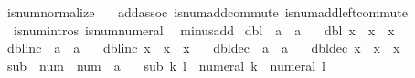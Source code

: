 \begin{isabellebody}
\endisatagproof
{\isafoldproof}%
%
\isadelimproof
\isanewline
%
\endisadelimproof
\isanewline
{}\isamarkupfalse%
\ is{\isacharunderscore}{\kern0pt}num{\isacharunderscore}{\kern0pt}normalize\ {\isacharequal}{\kern0pt}\isanewline
\ \ add{\isachardot}{\kern0pt}assoc\ is{\isacharunderscore}{\kern0pt}num{\isacharunderscore}{\kern0pt}add{\isacharunderscore}{\kern0pt}commute\ is{\isacharunderscore}{\kern0pt}num{\isacharunderscore}{\kern0pt}add{\isacharunderscore}{\kern0pt}left{\isacharunderscore}{\kern0pt}commute\isanewline
\ \ is{\isacharunderscore}{\kern0pt}num{\isachardot}{\kern0pt}intros\ is{\isacharunderscore}{\kern0pt}num{\isacharunderscore}{\kern0pt}numeral\isanewline
\ \ minus{\isacharunderscore}{\kern0pt}add\isanewline
\isanewline
{}\isamarkupfalse%
\ dbl\ {\isacharcolon}{\kern0pt}{\isacharcolon}{\kern0pt}\ {\isachardoublequoteopen}{\isacharprime}{\kern0pt}a\ {\isasymRightarrow}\ {\isacharprime}{\kern0pt}a{\isachardoublequoteclose}\isanewline
\ \ \ {\isachardoublequoteopen}dbl\ x\ {\isacharequal}{\kern0pt}\ x\ {\isacharplus}{\kern0pt}\ x{\isachardoublequoteclose}\isanewline
\isanewline
{}\isamarkupfalse%
\ dbl{\isacharunderscore}{\kern0pt}inc\ {\isacharcolon}{\kern0pt}{\isacharcolon}{\kern0pt}\ {\isachardoublequoteopen}{\isacharprime}{\kern0pt}a\ {\isasymRightarrow}\ {\isacharprime}{\kern0pt}a{\isachardoublequoteclose}\isanewline
\ \ \ {\isachardoublequoteopen}dbl{\isacharunderscore}{\kern0pt}inc\ x\ {\isacharequal}{\kern0pt}\ x\ {\isacharplus}{\kern0pt}\ x\ {\isacharplus}{\kern0pt}\ {}{\isachardoublequoteclose}\isanewline
\isanewline
{}\isamarkupfalse%
\ dbl{\isacharunderscore}{\kern0pt}dec\ {\isacharcolon}{\kern0pt}{\isacharcolon}{\kern0pt}\ {\isachardoublequoteopen}{\isacharprime}{\kern0pt}a\ {\isasymRightarrow}\ {\isacharprime}{\kern0pt}a{\isachardoublequoteclose}\isanewline
\ \ \ {\isachardoublequoteopen}dbl{\isacharunderscore}{\kern0pt}dec\ x\ {\isacharequal}{\kern0pt}\ x\ {\isacharplus}{\kern0pt}\ x\ {\isacharminus}{\kern0pt}\ {}{\isachardoublequoteclose}\isanewline
\isanewline
{}\isamarkupfalse%
\ sub\ {\isacharcolon}{\kern0pt}{\isacharcolon}{\kern0pt}\ {\isachardoublequoteopen}num\ {\isasymRightarrow}\ num\ {\isasymRightarrow}\ {\isacharprime}{\kern0pt}a{\isachardoublequoteclose}\isanewline
\ \ \ {\isachardoublequoteopen}sub\ k\ l\ {\isacharequal}{\kern0pt}\ numeral\ k\ {\isacharminus}{\kern0pt}\ numeral\ l{\isachardoublequoteclose}\isanewline
\isanewline

\end{isabellebody}
